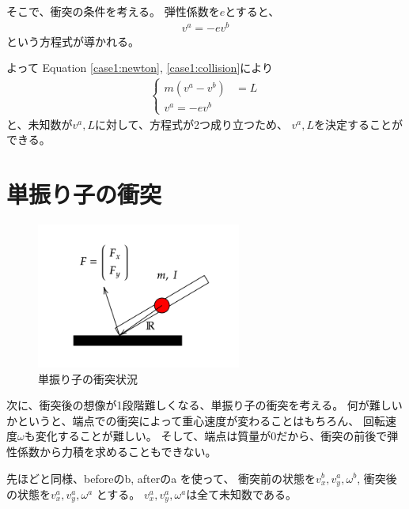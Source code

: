 \documentclass[a4paper,11pt]{jsarticle}
\begin{document}
そこで、衝突の条件を考える。
弾性係数を$e$とすると、
\begin{gather}
  v^a = -e v^b
  \label{case1:collision}
\end{gather}
という方程式が導かれる。

よって Equation \ref{case1:newton}, \ref{case1:collision}により
\begin{align*}
  \begin{cases}
    m(v^a - v^b) &= L
    \\
    v^a = -e v^b
  \end{cases}
\end{align*}
と、未知数が$v^a, L$に対して、方程式が2つ成り立つため、
$v^a, L$を決定することができる。

\section{単振り子の衝突}

\begin{figure}[h]
  \centering
  \includegraphics[width = 0.6\textwidth]{1seg_collision.png}
  \caption{単振り子の衝突状況}
  \label{1seg_collision.png}
\end{figure}

次に、衝突後の想像が1段階難しくなる、単振り子の衝突を考える。
何が難しいかというと、端点での衝突によって重心速度が変わることはもちろん、
回転速度$\omega$も変化することが難しい。
そして、端点は質量が0だから、衝突の前後で弾性係数から力積を求めることもできない。

先ほどと同様、beforeのb, afterのa を使って、
衝突前の状態を$v_x^b, v_y^a, \omega^b$,
衝突後の状態を$v_x^a, v_y^a, \omega^a$
とする。
$v_x^a, v_y^a, \omega^a$は全て未知数である。
\end{document}
